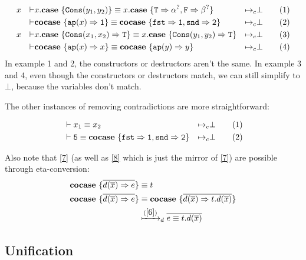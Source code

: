 \documentclass[twoside,12pt,a4paper]{article}
\begin{document}
\begin{example}
    \begin{align*}
        &x&\vdash& x.\textbf{case}\ \{\mathtt{Cons(}y_1, y_2\mathtt{)}\} 
        \equiv x.\textbf{case}\ \{\mathtt{T} \Rightarrow\alpha^?, \mathtt{F}\Rightarrow \beta^?\}
        &\mapsto_c& \bot \tag{1}\\
        &&\vdash& \textbf{cocase}\ \{\texttt{ap}(x)\Rightarrow \mathtt{1}\}
        \equiv \textbf{cocase}\ \{\mathtt{fst\Rightarrow 1, snd\Rightarrow 2}\}
        &\mapsto_c& \bot \tag{2}\\
        &x&\vdash& x.\textbf{case}\ \{\mathtt{Cons(}x_1, x_2\mathtt{)}\Rightarrow \mathtt{T}\} 
        \equiv x.\textbf{case}\ \{\mathtt{Cons(}y_1, y_2\mathtt{)}\Rightarrow\mathtt{T}\}
        &\mapsto_c& \bot \tag{3}\\
        &&\vdash& \textbf{cocase}\ \{\texttt{ap}(x)\Rightarrow x\}
        \equiv \textbf{cocase}\ \{\texttt{ap}(y)\Rightarrow y\}
        &\mapsto_c& \bot \tag{4}
    \end{align*}
    In example 1 and 2, the constructors or destructors aren't the same.
    In example 3 and 4, even though the constructors or destructors match, we can still simplify to $\bot$, because the variables don't match.
\end{example}

The other instances of removing contradictions are more straightforward:

\begin{example}
    \begin{align*}
        &\vdash x_1 \equiv x_2 &\mapsto_c&\bot\tag{1}\\ 
        &\vdash \mathtt{5}\equiv \textbf{cocase}\ \{\mathtt{fst\Rightarrow 1, snd\Rightarrow 2}\}&\mapsto_c& \bot\tag{2}
    \end{align*}
\end{example}

Also note that \cref{7} (as well as \cref{8} which is just the mirror of \cref{7}) are possible through eta-conversion:
\begin{align*}
    \excopatmatch{\overline{d(\overline{x})\Rightarrow e}}&\equiv t \\
    \excopatmatch{\overline{d(\overline{x})\Rightarrow e}}&\equiv \excopatmatch{\overline{d(\overline{x})\Rightarrow t.d(\overline{x})}}\\
    &\xmapsto{(\cref{6})}_d \overline{e \equiv t.d(\overline{x})}
\end{align*}

\subsection{Unification}
\end{document}

